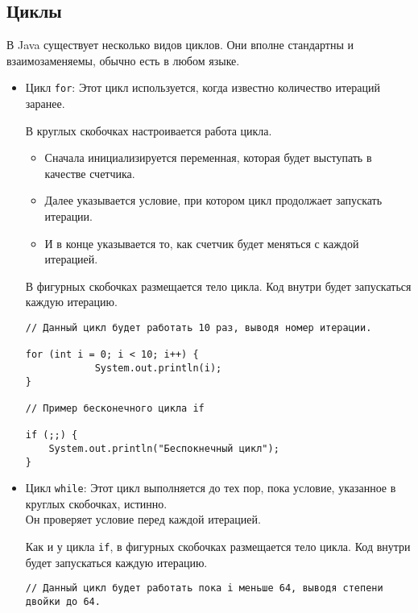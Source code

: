 \subsection{Циклы}
В Java существует несколько видов циклов. Они вполне стандартны и взаимозаменяемы, обычно есть в любом языке.
\begin{itemize}
    \item Цикл \texttt{for}: Этот цикл используется, когда известно количество итераций заранее.
    
    В круглых скобочках настроивается работа цикла.
    \begin{itemize}
        \item Сначала инициализируется переменная, которая будет выступать в качестве счетчика.
        \item Далее указывается условие, при котором цикл продолжает запускать итерации.
        \item И в конце указывается то, как счетчик будет меняться с каждой итерацией.
    \end{itemize}

    В фигурных скобочках размещается тело цикла. Код внутри будет запускаться каждую итерацию.

    \begin{verbatim}
// Данный цикл будет работать 10 раз, выводя номер итерации.

for (int i = 0; i < 10; i++) {
            System.out.println(i);
}

// Пример бесконечного цикла if

if (;;) {
    System.out.println("Беспокнечный цикл");
}
    \end{verbatim}
    \vspace{0.4cm}

    \item Цикл \texttt{while}: Этот цикл выполняется до тех пор, пока условие, указанное в круглых скобочках, истинно.\\
    Он проверяет условие перед каждой итерацией.\par
    Как и у цикла \texttt{if}, в фигурных скобочках размещается тело цикла. Код внутри будет запускаться каждую итерацию.

    \begin{verbatim}
// Данный цикл будет работать пока i меньше 64, выводя степени двойки до 64.


\end{verbatim}
\end{itemize}
